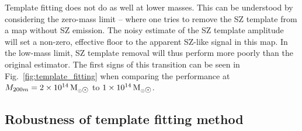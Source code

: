 Template fitting does not do as well at lower masses. 
This can be understood by considering  the zero-mass limit -- where one tries to remove the SZ template from a map without SZ emission. 
The noisy estimate of the SZ template amplitude will set a non-zero, effective floor to the apparent SZ-like signal in this map. 
In the low-mass limit, SZ template removal will thus perform more poorly than the original estimator. 
The first signs of this transition can be seen in Fig.~\ref{fig:template_fitting} when comparing the performance at $\mvir = 2\times 10^{14}\,\msolar$ to   $1\times 10^{14}\,\msolar$.


 
 



 



\subsection{Robustness of template fitting method}
\label{subsec:simsz}

